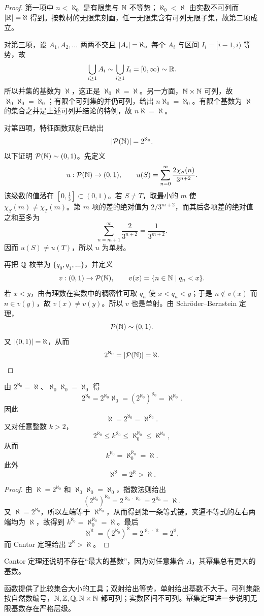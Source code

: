 \begin{proof}
  第一项中 $n<\aleph_0$ 是有限集与 $\mathbb{N}$ 不等势；$\aleph_0<\aleph$ 由实数不可列而 $\lvert\mathbb{R}\rvert=\aleph$ 得到。按教材的无限集刻画，任一无限集含有可列无限子集，故第二项成立。

  对第三项，设 $A_1,A_2,\ldots$ 两两不交且 $\lvert A_i\rvert=\aleph$。每个 $A_i$ 与区间 $I_i=[i-1,i)$ 等势，故
  \[
  \bigcup_{i\ge1}A_i\sim\bigcup_{i\ge1}I_i=[0,\infty)\sim\mathbb{R}.
  \]
  所以并集的基数为 $\aleph$，这正是 $\aleph_0\aleph=\aleph$。另一方面，$\mathbb{N}\times\mathbb{N}$ 可列，故 $\aleph_0\aleph_0=\aleph_0$；有限个可列集的并仍可列，给出 $n\aleph_0=\aleph_0$。有限个基数为 $\aleph$ 的集合之并是上述可列并结论的特例，故 $n\aleph=\aleph$。

  对第四项，特征函数双射已给出
  \[
  \lvert\mathcal P(\mathbb{N})\rvert=2^{\aleph_0}.
  \]
  以下证明 $\mathcal P(\mathbb{N})\sim(0,1)$。先定义
  \[
  u:\mathcal P(\mathbb{N})\to(0,1),\qquad
  u(S)=\sum_{n=0}^{\infty}\frac{2\chi_S(n)}{3^{n+2}}.
  \]
  该级数的值落在 $[0,\frac13]\subset(0,1)$。若 $S\ne T$，取最小的 $m$ 使 $\chi_S(m)\ne\chi_T(m)$。第 $m$ 项的差的绝对值为 $2/3^{m+2}$，而其后各项差的绝对值之和至多为
  \[
  \sum_{n=m+1}^{\infty}\frac{2}{3^{n+2}}=\frac{1}{3^{m+2}}.
  \]
  因而 $u(S)\ne u(T)$，所以 $u$ 为单射。

  再把 $\mathbb{Q}$ 枚举为 $\{q_0,q_1,\ldots\}$，并定义
  \[
  v:(0,1)\to\mathcal P(\mathbb{N}),\qquad
  v(x)=\{n\in\mathbb{N}\mid q_n<x\}.
  \]
  若 $x<y$，由有理数在实数中的稠密性可取 $q_n$ 使 $x<q_n<y$；于是 $n\notin v(x)$ 而 $n\in v(y)$，故 $v(x)\ne v(y)$。所以 $v$ 也是单射。由 Schröder--Bernstein 定理，
  \[
  \mathcal P(\mathbb{N})\sim(0,1).
  \]
  又 $\lvert(0,1)\rvert=\aleph$，从而
  \[
  2^{\aleph_0}=\lvert\mathcal P(\mathbb{N})\rvert=\aleph.
  \]
\end{proof}

\begin{theorem}[幂运算公式]\label{aleph-power-laws}
  由 $2^{\aleph_0}=\aleph$、$\aleph_0\aleph_0=\aleph_0$ 得
  \[
  2^{\aleph_0}
  =2^{\aleph_0}\aleph_0
  =(2^{\aleph_0})^{\aleph_0}
  =\aleph^{\aleph_0}.
  \]
  因此
  \[
  \aleph=2^{\aleph_0}=\aleph^{\aleph_0}.
  \]
  又对任意整数 $k>2$，
  \[
  2^{\aleph_0}\le k^{\aleph_0}
  \le\aleph_0^{\aleph_0}
  \le\aleph^{\aleph_0},
  \]
  从而
  \[
  k^{\aleph_0}=\aleph_0^{\aleph_0}=\aleph.
  \]
  此外
  \[
  \aleph^{\aleph}=2^{\aleph}>\aleph.
  \]
\end{theorem}

\begin{proof}
  由 $\aleph=2^{\aleph_0}$ 和 $\aleph_0\aleph_0=\aleph_0$，指数法则给出
  \[
  (2^{\aleph_0})^{\aleph_0}
  =2^{\aleph_0\cdot\aleph_0}
  =2^{\aleph_0}=\aleph.
  \]
  又 $\aleph=2^{\aleph_0}$，所以左端等于 $\aleph^{\aleph_0}$，从而得到第一条等式链。夹逼不等式的左右两端均为 $\aleph$，故得到 $k^{\aleph_0}=\aleph_0^{\aleph_0}=\aleph$。最后
  \[
  \aleph^{\aleph}=(2^{\aleph_0})^{\aleph}
  =2^{\aleph_0\cdot\aleph}=2^{\aleph},
  \]
  而 Cantor 定理给出 $2^{\aleph}>\aleph$。
\end{proof}

Cantor 定理还说明不存在“最大的基数”，因为对任意集合 $A$，其幂集总有更大的基数。

\begin{summary}[本节提要]
  函数提供了比较集合大小的工具；双射给出等势，单射给出基数不大于。可列集能按自然数编号，$\mathbb{N},\mathbb{Z},\mathbb{Q},\mathbb{N}\times\mathbb{N}$ 都可列；实数区间不可列。幂集定理进一步说明无限基数存在严格层级。
\end{summary}
